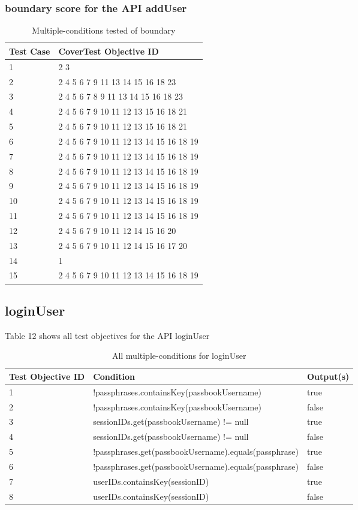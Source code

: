 \documentclass{article}
\begin{document}
\subsubsection{boundary score for the API addUser}
\begin{longtable}{|p{2cm}|p{8cm}|}
\caption{Multiple-conditions tested of boundary}\\
\hline 
Test Case& CoverTest Objective ID\\
\hline  
1&2 3\\
\hline
2&2 4 5 6 7 9 11 13 14 15 16 18 23\\
\hline
3&2 4 5 6 7 8 9 11 13 14 15 16 18 23\\
\hline
4&2 4 5 6 7 9 10 11 12 13 15 16 18 21\\
\hline
5&2 4 5 6 7 9 10 11 12 13 15 16 18 21\\
\hline
6&2 4 5 6 7 9 10 11 12 13 14 15 16 18 19\\
\hline
7&2 4 5 6 7 9 10 11 12 13 14 15 16 18 19\\
\hline
8&2 4 5 6 7 9 10 11 12 13 14 15 16 18 19\\
\hline
9&2 4 5 6 7 9 10 11 12 13 14 15 16 18 19\\
\hline
10&2 4 5 6 7 9 10 11 12 13 14 15 16 18 19\\
\hline
11&2 4 5 6 7 9 10 11 12 13 14 15 16 18 19\\
\hline
12&2 4 5 6 7 9 10 11 12 14 15 16 20\\
\hline
13&2 4 5 6 7 9 10 11 12 14 15 16 17 20\\
\hline
14&1\\
\hline
15&2 4 5 6 7 9 10 11 12 13 14 15 16 18 19\\
\hline
\end{longtable}

\subsection{loginUser}
Table 12 shows all test objectives for the API loginUser
\begin{longtable}{|p{2cm}|p{10cm}|p{3cm}|}
\caption{All multiple-conditions for loginUser}\\
\hline 
Test Objective ID&Condition&Output(s)\\
\hline  
1&!passphrases.containsKey(passbookUsername)&true\\
\hline
2&!passphrases.containsKey(passbookUsername)&false\\
\hline
3&sessionIDs.get(passbookUsername) != null&true\\
\hline
4&sessionIDs.get(passbookUsername) != null&false\\
\hline
5&!passphrases.get(passbookUsername).equals(passphrase)&true\\
\hline
6&!passphrases.get(passbookUsername).equals(passphrase)&false\\
\hline
7&userIDs.containsKey(sessionID)&true\\
\hline
8&userIDs.containsKey(sessionID)&false\\
\hline
\end{longtable}
\end{document}

